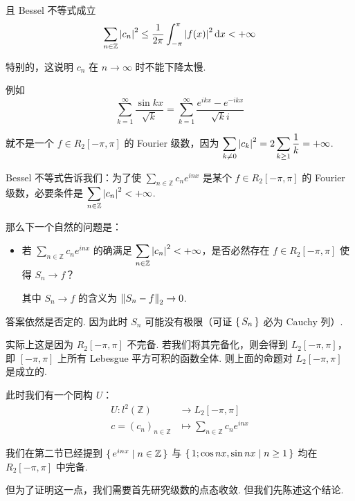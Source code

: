 且 Bessel 不等式成立
$$
\sum_{n\in\mathbb{Z}}\left\lvert{c_n}\right\rvert^2\le\frac{1}{2\pi}\int_{-\pi}^{\pi}\left\lvert{f(x)}\right\rvert^2\mathrm{d} x<+\infty
$$

特别的，这说明 $c_n$ 在 $n\to\infty$ 时不能下降太慢.

例如
$$
\displaystyle\sum_{k=1}^\infty\frac{\sin kx}{\sqrt{k}}=\sum_{k=1}^\infty\frac{e^{ikx}-e^{-ikx}}{\sqrt{k}i}
$$

就不是一个 $f\in R_2[-\pi,\pi]$ 的 Fourier 级数，因为 $\displaystyle\sum_{k\ne 0}\left\lvert{c_k}\right\rvert^2=2\sum_{k\ge 1}\frac{1}{k}=+\infty$.

Bessel 不等式告诉我们：为了使 $\displaystyle\sum_{n\in\mathbb{Z}}c_ne^{inx}$ 是某个 $f\in R_2[-\pi,\pi]$ 的 Fourier 级数，必要条件是 $\displaystyle\sum_{n\in\mathbb{Z}}\left\lvert{c_n}\right\rvert^2<+\infty$.

那么下一个自然的问题是：

\begin{itemize}
    \item 若 $\displaystyle\sum_{n\in\mathbb{Z}}c_ne^{inx}$ 的确满足 $\displaystyle\sum_{n\in\mathbb{Z}}\left\lvert{c_n}\right\rvert^2<+\infty$，是否必然存在 $f\in R_2[-\pi,\pi]$ 使得 $S_n\to f$？
    
    其中 $S_n\to f$ 的含义为 $\left\lVert{S_n-f}\right\rVert_2\to 0$.
\end{itemize}

答案依然是否定的. 因为此时 $S_n$ 可能没有极限（可证 $\set{S_n}$ 必为 Cauchy 列）.

实际上这是因为 $R_2[-\pi,\pi]$ 不完备. 若我们将其完备化，则会得到 $L_2[-\pi,\pi]$，即 $[-\pi,\pi]$ 上所有 Lebesgue 平方可积的函数全体. 则上面的命题对 $L_2[-\pi,\pi]$ 是成立的.

此时我们有一个同构 $U$：
$$
\begin{aligned}
    U:l^2(\mathbb{Z})&\to L_2[-\pi,\pi]\\
    c=(c_n)_{n\in\mathbb{Z}}&\mapsto\sum_{n\in\mathbb{Z}}c_ne^{inx}
\end{aligned}
$$


我们在第二节已经提到 $\set{e^{inx}|n\in\mathbb{Z}}$ 与 $\set{1;\cos nx,\sin nx|n\ge 1}$ 均在 $R_2[-\pi,\pi]$ 中完备.

但为了证明这一点，我们需要首先研究级数的点态收敛. 但我们先陈述这个结论.

